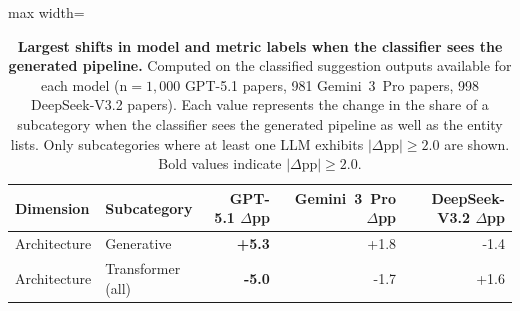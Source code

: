 \begin{table}[h!]
\centering
\caption{\textbf{Largest shifts in model and metric labels when the classifier sees the generated pipeline.} Computed on the classified suggestion outputs available for each model (n$=1{,}000$ GPT-5.1 papers, 981 Gemini~3~Pro papers, 998 DeepSeek-V3.2 papers). Each value represents the change in the share of a subcategory when the classifier sees the generated pipeline as well as the entity lists. Only subcategories where at least one LLM exhibits $|\Delta\text{pp}| \geq 2.0$ are shown. Bold values indicate $|\Delta\text{pp}| \geq 2.0$.}
\label{tab:pipeline_ablation_model_metric}
\begin{adjustbox}{max width=\textwidth}
\begin{tabular}{ll rrr}
\toprule
Dimension & Subcategory & GPT-5.1 $\Delta$pp & Gemini~3~Pro $\Delta$pp & DeepSeek-V3.2 $\Delta$pp \\
\midrule
Architecture & Generative & \textbf{+5.3} & +1.8 & -1.4 \\
Architecture & Transformer (all) & \textbf{-5.0} & -1.7 & +1.6 \\
\bottomrule
\end{tabular}
\end{adjustbox}
\end{table}
